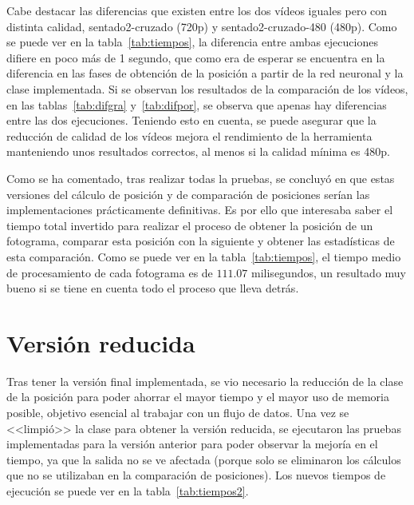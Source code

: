 {Cabe destacar las diferencias que existen entre los dos vídeos iguales pero con distinta calidad, sentado2-cruzado (720p) y sentado2-cruzado-480 (480p). Como se puede ver en la tabla~\ref{tab:tiempos}, la diferencia entre ambas ejecuciones difiere en poco más de 1 segundo, que como era de esperar se encuentra en la diferencia en las fases de obtención de la posición a partir de la red neuronal y la clase implementada. Si se observan los resultados de la comparación de los vídeos, en las tablas~\ref{tab:difgra} y~\ref{tab:difpor}, se observa que apenas hay diferencias entre las dos ejecuciones. Teniendo esto en cuenta, se puede asegurar que la reducción de calidad de los vídeos mejora el rendimiento de la herramienta manteniendo unos resultados correctos, al menos si la calidad mínima es 480p.

Como se ha comentado, tras realizar todas la pruebas, se concluyó en que estas versiones del cálculo de posición y de comparación de posiciones serían las implementaciones prácticamente definitivas. Es por ello que interesaba saber el tiempo total invertido para realizar el proceso de obtener la posición de un fotograma, comparar esta posición con la siguiente y obtener las estadísticas de esta comparación. Como se puede ver en la tabla~\ref{tab:tiempos}, el tiempo medio de procesamiento de cada fotograma es de $111.07$ milisegundos, un resultado muy bueno si se tiene en cuenta todo el proceso que lleva detrás.

\section{Versión reducida} \label{reducida}
Tras tener la versión final implementada, se vio necesario la reducción de la clase de la posición para poder ahorrar el mayor tiempo y el mayor uso de memoria posible, objetivo esencial al trabajar con un flujo de datos. Una vez se <<limpió>> la clase para obtener la versión reducida, se ejecutaron las pruebas implementadas para la versión anterior para poder observar la mejoría en el tiempo, ya que la salida no se ve afectada (porque solo se eliminaron los cálculos que no se utilizaban en la comparación de posiciones). Los nuevos tiempos de ejecución se puede ver en la tabla~\ref{tab:tiempos2}.

}
